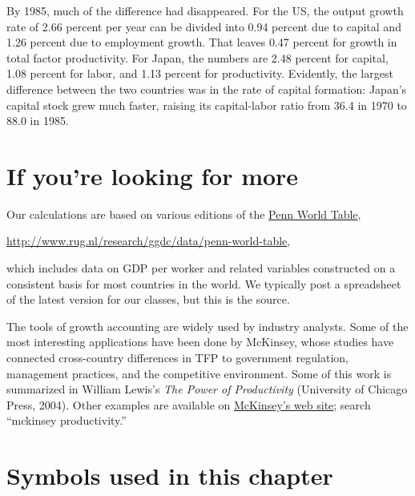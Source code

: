 \begin{enumerate}
By 1985, much of the difference had disappeared.
For the US, the output growth rate of 2.66 percent per year can be divided
into 0.94 percent due to capital and 1.26 percent due to employment growth.
That leaves 0.47 percent for growth in total factor productivity.
For Japan, the numbers are 2.48 percent for capital, 1.08 percent for
labor, and 1.13 percent for productivity.
Evidently, the largest difference between the two
countries was in the rate of capital formation:  Japan's capital stock
grew much faster, raising its capital-labor ratio from
36.4 in 1970 to 88.0 in 1985.
\end{enumerate}

\section*{If you're looking for more}

Our calculations are based on various editions of the
\href{http://www.rug.nl/research/ggdc/data/penn-world-table}{Penn World Table},

\vspace*{\parskip}
\centerline{\url{http://www.rug.nl/research/ggdc/data/penn-world-table},}

which includes data on GDP per worker and related variables constructed
on a consistent basis for most countries in the world.
We typically post a spreadsheet of the latest version for our classes,
but this is the source.

The tools of growth accounting
 are widely used by industry analysts.
Some of the most interesting applications have been done by McKinsey,
whose studies have connected cross-country differences in TFP to
government regulation, management practices, and the competitive environment.
Some of this work is summarized in William Lewis's
{\it The Power of Productivity\/}
(University of Chicago Press, 2004).
Other examples are available on \href{http://www.mckinsey.com/insights/mgi/research/productivity_competitiveness_and_growth}{McKinsey's web site};
search ``mckinsey productivity.''

\section*{Symbols used in this chapter}

